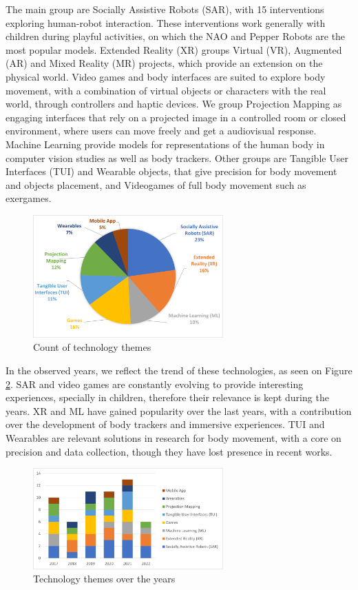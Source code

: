 \documentclass[a4paper,fleqn]{cas-sc}
\begin{document}
The main group are Socially Assistive Robots (SAR), with 15 interventions exploring human-robot interaction. These interventions work generally with children during playful activities, on which the NAO and Pepper Robots are the most popular models. Extended Reality (XR) groups Virtual (VR), Augmented (AR) and Mixed Reality (MR) projects, which provide an extension on the physical world. Video games and body interfaces are suited to explore body movement, with a combination of virtual objects or characters with the real world, through controllers and haptic devices. We group Projection Mapping as engaging interfaces that rely on a projected image in a controlled room or closed environment, where users can move freely and get a audiovisual response. Machine Learning provide models for representations of the human body in computer vision studies as well as body trackers. Other groups are Tangible User Interfaces (TUI) and Wearable objects, that give precision for body movement and objects placement, and Videogames of full body movement such as exergames.

\begin{figure}
	\includegraphics[width=0.65\textwidth]{fig6_tech-themes-general.png}
        \centering
	  \caption{Count of technology themes}\label{fig:tech-themes-count}
\end{figure}


In the observed years, we reflect the trend of these technologies, as seen on Figure \ref{fig:tech-themes-years}. SAR and video games are constantly evolving to provide interesting experiences, specially in children, therefore their relevance is kept during the years. XR and ML have gained popularity over the last years, with a contribution over the development of body trackers and immersive experiences. TUI and Wearables are relevant solutions in research for body movement, with a core on precision and data collection, though they have lost presence in recent works.

\begin{figure}
	\includegraphics[width=0.65\textwidth]{fig7_tech-themes-years.png}
        \centering
	  \caption{Technology themes over the years}\label{fig:tech-themes-years}
\end{figure}
\end{document}
